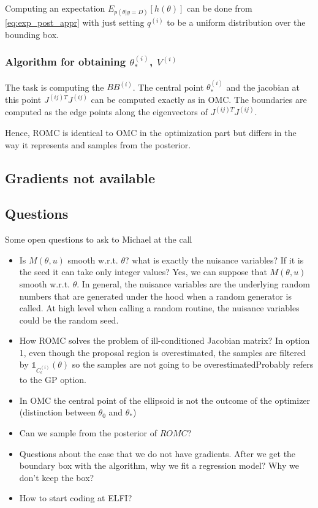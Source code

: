 \documentclass{article}
\begin{document}
Computing an expectation $E_{p(\theta|y=D)}[h(\theta)]$ can be done from \ref{eq:exp_post_appr} with just setting  $q^{(i)}$ to be a uniform distribution over the bounding box.


\subsubsection*{Algorithm for obtaining $\theta_*^{(i)}$, $V^{(i)}$}

The task is computing the $BB^{(i)}$. The central point $\theta_*^{(i)}$ and the jacobian at this point $J^{(ij)T}J^{(ij)}$ can be computed exactly as in OMC. The boundaries are computed as the edge points along the eigenvectors of $J^{(ij)T}J^{(ij)}$.

Hence, ROMC is identical to OMC in the optimization part but differs in the way it represents and samples from the posterior.

\subsection{Gradients not available}



\subsection*{Questions}

Some open questions to ask to Michael at the call

\begin{itemize}
\item Is $M(\theta, u)$ smooth w.r.t. $\theta$? what is exactly the nuisance variables? If it is the seed it can take only integer values? Yes, we can suppose that $M(\theta, u)$ smooth w.r.t. $\theta$. In general, the nuisance variables are the underlying random numbers that are generated under the hood when a random generator is called. At high level when calling a random routine, the nuisance variables could be the random seed.
\item How ROMC solves the problem of ill-conditioned Jacobian matrix? In option 1, even though the proposal region is overestimated, the samples are filtered by $\mathbb{1}_{C_\epsilon^{(i)}}(\theta)$ so the samples are not going to be overestimatedProbably refers to the GP option.
\item In OMC the central point of the ellipsoid is not the outcome of the optimizer (distinction between $\theta_0$ and $\theta_*$)
\item Can we sample from the posterior of $ROMC$?
\item Questions about the case that we do not have gradients. After we get the boundary box with the algorithm, why we fit a regression model? Why we don't keep the box? 
  \item How to start coding at ELFI?
  \end{itemize}
\end{document}
